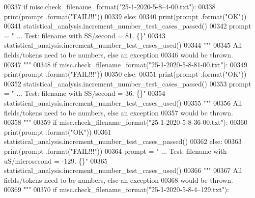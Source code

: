 \begin{DoxyCode}
00337         \textcolor{keywordflow}{if} misc.check\_filename\_format(\textcolor{stringliteral}{"25-1-2020-5-8--4-00.txt"}):
00338             print(prompt .format(\textcolor{stringliteral}{"FAIL!!!"}))
00339         \textcolor{keywordflow}{else}:
00340             print(prompt .format(\textcolor{stringliteral}{"OK"}))
00341             statistical\_analysis.increment\_number\_test\_cases\_passed()
00342         prompt = \textcolor{stringliteral}{"  ... Test: filename with SS/second = 81.         \{\}"}
00343         statistical\_analysis.increment\_number\_test\_cases\_used()
00344         \textcolor{stringliteral}{"""}
00345 \textcolor{stringliteral}{            All fields/tokens need to be numbers, else an exception}
00346 \textcolor{stringliteral}{                would be thrown.}
00347 \textcolor{stringliteral}{        """}
00348         \textcolor{keywordflow}{if} misc.check\_filename\_format(\textcolor{stringliteral}{"25-1-2020-5-8-81-00.txt"}):
00349             print(prompt .format(\textcolor{stringliteral}{"FAIL!!!"}))
00350         \textcolor{keywordflow}{else}:
00351             print(prompt .format(\textcolor{stringliteral}{"OK"}))
00352             statistical\_analysis.increment\_number\_test\_cases\_passed()
00353         prompt = \textcolor{stringliteral}{"  ... Test: filename with SS/second = 36.         \{\}"}
00354         statistical\_analysis.increment\_number\_test\_cases\_used()
00355         \textcolor{stringliteral}{"""}
00356 \textcolor{stringliteral}{            All fields/tokens need to be numbers, else an exception}
00357 \textcolor{stringliteral}{                would be thrown.}
00358 \textcolor{stringliteral}{        """}
00359         \textcolor{keywordflow}{if} misc.check\_filename\_format(\textcolor{stringliteral}{"25-1-2020-5-8-36-00.txt"}):
00360             print(prompt .format(\textcolor{stringliteral}{"OK"}))
00361             statistical\_analysis.increment\_number\_test\_cases\_passed()
00362         \textcolor{keywordflow}{else}:
00363             print(prompt .format(\textcolor{stringliteral}{"FAIL!!!"}))
00364         prompt = \textcolor{stringliteral}{"  ... Test: filename with uS/microsecond = -129.      \{\}"}
00365         statistical\_analysis.increment\_number\_test\_cases\_used()
00366         \textcolor{stringliteral}{"""}
00367 \textcolor{stringliteral}{            All fields/tokens need to be numbers, else an exception}
00368 \textcolor{stringliteral}{                would be thrown.}
00369 \textcolor{stringliteral}{        """}
00370         \textcolor{keywordflow}{if} misc.check\_filename\_format(\textcolor{stringliteral}{"25-1-2020-5-8-4--129.txt"}):

\end{DoxyCode}
